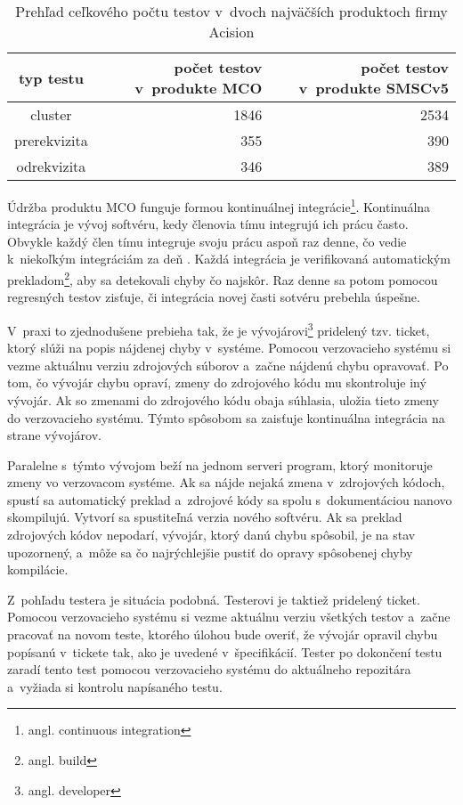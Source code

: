 \begin{table}
  \begin{center}
    \begin{tabular}{| c | r | r |}
    \hline
    typ testu & počet testov v~produkte MCO & počet testov v~produkte SMSCv5 \\ \hline
    cluster & 1846 & 2534 \\ \hline
    prerekvizita & 355 & 390 \\ \hline
    odrekvizita & 346 & 389 \\
    \hline
    \end{tabular}
    \caption{Prehľad ceľkového počtu testov v~dvoch najväčších 
             produktoch firmy Acision}
    \label{tabulka:pocet_testov}
  \end{center}
\end{table}

Údržba produktu MCO funguje formou kontinuálnej 
integrácie\footnote{angl. continuous integration}.
Kontinuálna integrácia je vývoj softvéru, kedy členovia tímu integrujú
ich prácu často. Obvykle každý člen tímu integruje svoju prácu aspoň 
raz denne, čo vedie k~niekoľkým integráciám za deň 
\cite{Continuous_integration}.
Každá integrácia je verifikovaná automatickým 
prekladom\footnote{angl. build}, aby sa detekovali chyby čo najskôr. 
Raz denne sa potom pomocou regresných testov zisťuje,
či integrácia novej časti sotvéru prebehla úspešne.

V~praxi to zjednodušene prebieha tak, že je vývojárovi\footnote{angl. developer}
pridelený tzv. ticket, ktorý slúži na popis nájdenej chyby v~systéme. 
Pomocou verzovacieho systému si vezme aktuálnu verziu zdrojových súborov 
a~začne nájdenú chybu opravovať.
Po tom, čo vývojár chybu opraví, zmeny do zdrojového kódu mu skontroluje 
iný vývojár. Ak so zmenami do zdrojového kódu obaja súhlasia, uložia 
tieto zmeny do verzovacieho systému. Týmto spôsobom sa zaisťuje 
kontinuálna integrácia na strane vývojárov.

Paralelne s~týmto vývojom beží na jednom serveri program, ktorý 
monitoruje zmeny vo verzovacom systéme. Ak sa nájde nejaká zmena 
v~zdrojových kódoch, spustí sa automatický preklad a~zdrojové kódy sa 
spolu s~dokumentáciou nanovo skompilujú. Vytvorí sa spustiteľná verzia 
nového softvéru. Ak sa preklad zdrojových kódov nepodarí, vývojár, ktorý 
danú chybu spôsobil, je na stav upozornený, a~môže sa čo najrýchlejšie 
pustiť do opravy spôsobenej chyby kompilácie.

Z~pohľadu testera je situácia podobná. Testerovi je taktiež pridelený 
ticket. Pomocou verzovacieho systému si vezme aktuálnu verziu
všetkých testov a~začne pracovať na novom teste, ktorého úlohou bude 
overiť, že vývojár opravil chybu popísanú v~tickete tak, ako je 
uvedené v~špecifikácií.
Tester po dokončení testu zaradí tento test pomocou verzovacieho 
systému do aktuálneho repozitára a~vyžiada si kontrolu napísaného testu. 

